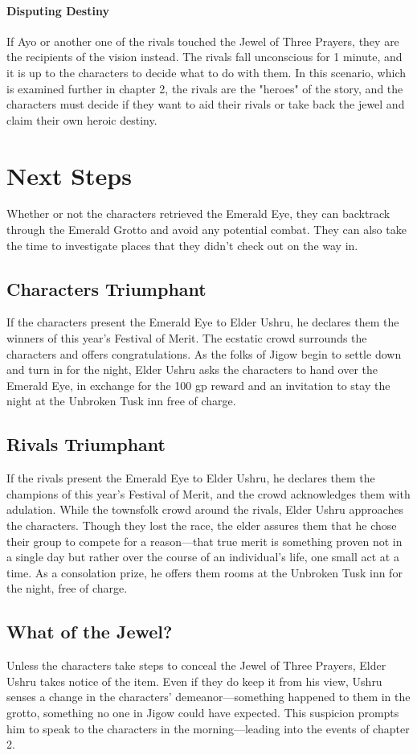 \documentclass[10pt,a4,twoside,twocolumn,openany,nodeprecatedcode]{dndbook}
\begin{document}
\paragraph{Disputing Destiny}
If Ayo or another one of the rivals touched the Jewel of Three Prayers, they are the recipients of the vision instead. The rivals fall unconscious for 1 minute, and it is up to the characters to decide what to do with them. In this scenario, which is examined further in chapter 2, the rivals are the "heroes" of the story, and the characters must decide if they want to aid their rivals or take back the jewel and claim their own heroic destiny.
\section{Next Steps}
Whether or not the characters retrieved the Emerald Eye, they can backtrack through the Emerald Grotto and avoid any potential combat. They can also take the time to investigate places that they didn't check out on the way in.
\subsection{Characters Triumphant}
If the characters present the Emerald Eye to Elder Ushru, he declares them the winners of this year's Festival of Merit. The ecstatic crowd surrounds the characters and offers congratulations.
As the folks of Jigow begin to settle down and turn in for the night, Elder Ushru asks the characters to hand over the Emerald Eye, in exchange for the 100 gp reward and an invitation to stay the night at the Unbroken Tusk inn free of charge.
\subsection{Rivals Triumphant}
If the rivals present the Emerald Eye to Elder Ushru, he declares them the champions of this year's Festival of Merit, and the crowd acknowledges them with adulation.
While the townsfolk crowd around the rivals, Elder Ushru approaches the characters. Though they lost the race, the elder assures them that he chose their group to compete for a reason—that true merit is something proven not in a single day but rather over the course of an individual's life, one small act at a time. As a consolation prize, he offers them rooms at the Unbroken Tusk inn for the night, free of charge.
\subsection{What of the Jewel?}
Unless the characters take steps to conceal the Jewel of Three Prayers, Elder Ushru takes notice of the item. Even if they do keep it from his view, Ushru senses a change in the characters' demeanor—something happened to them in the grotto, something no one in Jigow could have expected. This suspicion prompts him to speak to the characters in the morning—leading into the events of chapter 2.
\end{document}
